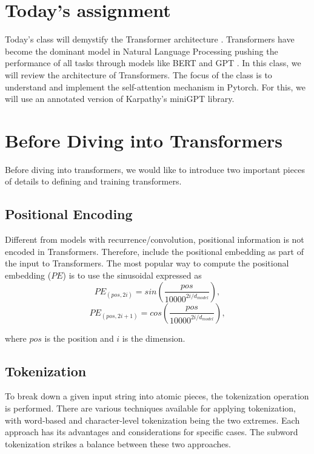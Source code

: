 \section{Today's assignment}
Today's class will demystify the Transformer architecture \cite{vaswani2017attention}. Transformers have become the dominant model in Natural Language Processing pushing the performance of all tasks through models like BERT \cite{devlin2018bert} and GPT \cite{brown2020language}. In this class, we will review the architecture of Transformers. The focus of the class is to understand and implement the self-attention mechanism in Pytorch. For this, we will use an annotated version of Karpathy's miniGPT library.


\section{Before Diving into Transformers}
Before diving into transformers, we would like to introduce two important pieces of details to defining and training transformers.


\subsection{Positional Encoding}
Different from models with recurrence/convolution, positional information is not encoded in Transformers. Therefore, \citet{vaswani2017attention} include the positional embedding as part of the input to Transformers. The most popular way to compute the positional embedding ($PE$) is to use the sinusoidal expressed as
\begin{equation}
        PE_{(pos,2i)} = sin(\frac{pos}{ 10000^{2i/d_{model}}}),
\end{equation}
\begin{equation}
    PE_{(pos,2i+1)} = cos(\frac{pos}{ 10000^{2i/d_{model}}}),
\end{equation}

where $pos$ is the position and $i$ is the dimension.

\subsection{Tokenization}
To break down a given input string into atomic pieces, the tokenization operation is performed. There are various techniques available for applying tokenization, with word-based and character-level tokenization being the two extremes. Each approach has its advantages and considerations for specific cases. The subword tokenization strikes a balance between these two approaches.

